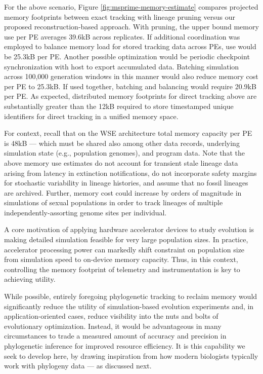 For the above scenario, Figure \ref{fig:msprime-memory-estimate} compares projected memory footprints between exact tracking with lineage pruning versus our proposed reconstruction-based approach.
With pruning, the upper bound memory use per PE averages 39.6kB across replicates.
If additional coordination was employed to balance memory load for stored tracking data across PEs, use would be 25.3kB per PE.
Another possible optimization would be periodic checkpoint synchronization with host to export accumulated data.
Batching simulation across 100,000 generation windows in this manner would also reduce memory cost per PE to 25.3kB.
If used together, batching and balancing would require 20.9kB per PE.
As expected, distributed memory footprints for direct tracking above are substantially greater than the 12kB required to store timestamped unique identifiers for direct tracking in a unified memory space.

For context, recall that on the WSE architecture total memory capacity per PE is 48kB --- which must be shared also among other data records, underlying simulation state (e.g., population genomes), and program data.
Note that the above memory use estimates do not account for transient stale lineage data arising from latency in extinction notifications, do not incorporate safety margins for stochastic variability in lineage histories, and assume that no fossil lineages are archived.
Further, memory cost could increase by orders of magnitude in simulations of sexual populations in order to track lineages of multiple independently-assorting genome sites per individual.

A core motivation of applying hardware accelerator devices to study evolution is making detailed simulation feasible for very large population sizes.
In practice, accelerator processing power can markedly shift constraint on population size from simulation speed to on-device memory capacity.
Thus, in this context, controlling the memory footprint of telemetry and instrumentation is key to achieving utility.

While possible, entirely foregoing phylogenetic tracking to reclaim memory would significantly reduce the utility of simulation-based evolution experiments and, in application-oriented cases, reduce visibility into the nuts and bolts of evolutionary optimization.
Instead, it would be advantageous in many circumstances to trade a measured amount of accuracy and precision in phylogenetic inference for improved resource efficiency.
It is this capability we seek to develop here, by drawing inspiration from how modern biologists typically work with phylogeny data --- as discussed next.

